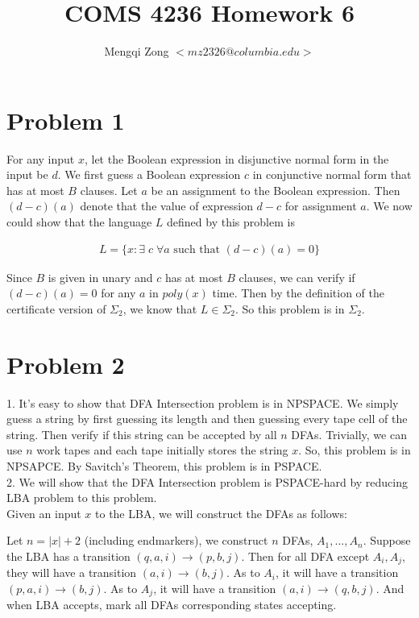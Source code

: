 \documentclass[12pt]{article}
\title{COMS 4236 Homework 6}
\author{Mengqi Zong $<mz2326@columbia.edu>$}
\begin{document}
\maketitle

\setlength{\parindent}{0in}

\section*{Problem 1}

For any input $x$, let the Boolean expression in disjunctive normal
form in the input be $d$. We first guess a Boolean expression $c$ in
conjunctive normal form that has at most $B$ clauses. Let $a$ be an
assignment to the Boolean expression. Then $(d - c)(a)$ denote that
the value of expression $d - c$ for assignment $a$. We now could show
that the language $L$ defined by this problem is

\begin{eqnarray*}
L = \{ x: \exists \; c \; \forall a \text { such that } (d - c)(a) = 0
\}
\end{eqnarray*}

Since $B$ is given in unary and $c$ has at most $B$ clauses, we can
verify if $(d - c)(a) = 0$ for any $a$ in $poly(x)$ time. Then by the
definition of the certificate version of $\Sigma_2$, we know that $L
\in \Sigma_2$. So this problem is in $\Sigma_2$.

\section*{Problem 2}

1. It's easy to show that DFA Intersection problem is in NPSPACE. We
simply guess a string by first guessing its length and then guessing
every tape cell of the string. Then verify if this string can be
accepted by all $n$ DFAs. Trivially, we can use $n$ work tapes and
each tape initially stores the string $x$. So, this problem is in
NPSAPCE. By Savitch's Theorem, this problem is in PSPACE. \\

2. We will show that the DFA Intersection problem is PSPACE-hard
by reducing LBA problem to this problem. \\

Given an input $x$ to the LBA, we will construct the DFAs as follows:

Let $n = |x| + 2$ (including endmarkers), we construct $n$ DFAs,
$A_1,...,A_n$. Suppose the LBA has a transition $(q, a, i) \rightarrow
(p, b, j)$. Then for all DFA except $A_i, A_j$, they will have a
transition $(a, i) \rightarrow (b, j)$. As to $A_i$, it will have a
transition $(p, a, i) \rightarrow (b, j)$. As to $A_j$, it will have a
transition $(a, i) \rightarrow (q, b, j)$. And when LBA accepts, mark
all DFAs corresponding states accepting. \\
\end{document}
